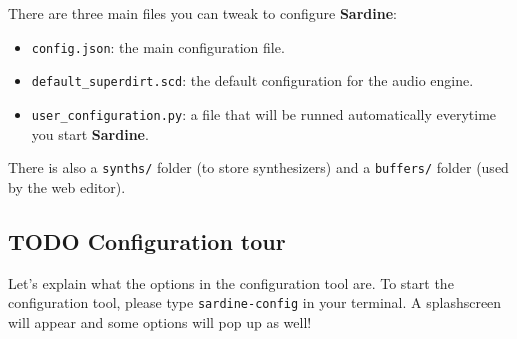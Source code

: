 \documentclass[11pt]{article}
\begin{document}
There are three main files you can tweak to configure \textbf{Sardine}:
\begin{itemize}
\item \texttt{config.json}: the main configuration file.
\item \texttt{default\_superdirt.scd}: the default configuration for the audio engine.
\item \texttt{user\_configuration.py}: a file that will be runned automatically everytime you start \textbf{Sardine}.
\end{itemize}
There is also a \texttt{synths/} folder (to store synthesizers) and a \texttt{buffers/} folder (used by the web editor).

\subsection{{\bfseries\sffamily TODO} Configuration tour}
\label{sec:orge7d6bd3}

Let's explain what the options in the configuration tool are. To start the configuration tool, please type \texttt{sardine-config} in your terminal. A splashscreen will appear and some options will pop up as well!
\end{document}
